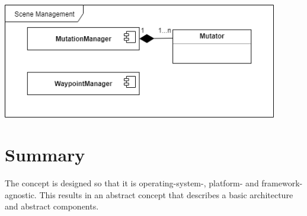 \begin{center}
\noindent\includegraphics[width=12cm]{tex/img/ch04/ComponentDiagram_SceneManagement02.png}
\label{fig:component-diagram-scenemanagement}
\end{center}


\section{Summary}
The concept is designed so that it is operating-system-, platform- and framework-agnostic. This results in an abstract concept that describes a basic architecture and abstract components.